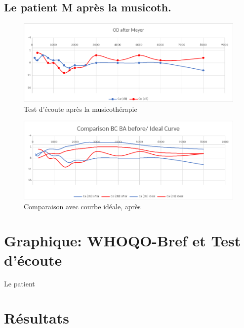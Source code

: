 	
 	\subsection{Le patient M après la musicoth.}
 	\lipsum[1]
 	\begin{figure}[h]
 		\centering

 		\includegraphics[width=0.7\linewidth]{images/clinique/od_after_meyer.png}
 		\caption{Test d'écoute après la musicothérapie}
 		\label{fig:odaftermeyer}
 	\end{figure}
 
 \lipsum[1]
 
 \begin{figure}[bh]
 	\centering
 	\includegraphics[width=0.7\linewidth]{images/clinique/comparison_bc_ba_after_vs_ideal_curve_meyer.png}
 	\caption{Comparaison avec courbe idéale, après}
 	\label{fig:comparisonbcbaaftervsidealcurvemeyer}
 \end{figure}
 
 





      



 


\section{Graphique:  WHOQO-Bref et Test d'écoute}

Le patient 


\section{Résultats}










